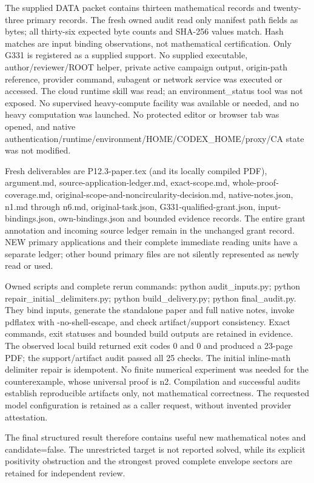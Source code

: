 \documentclass[11pt]{article}
\begin{document}
The supplied DATA packet contains thirteen mathematical records and twenty-three primary records. The fresh owned audit read only manifest path fields as bytes; all thirty-six expected byte counts and SHA-256 values match. Hash matches are input binding observations, not mathematical certification. Only G331 is registered as a supplied support. No supplied executable, author/reviewer/ROOT helper, private active campaign output, origin-path reference, provider command, subagent or network service was executed or accessed. The cloud runtime skill was read; an environment\_status tool was not exposed. No supervised heavy-compute facility was available or needed, and no heavy computation was launched. No protected editor or browser tab was opened, and native authentication/runtime/environment/HOME/CODEX\_HOME/proxy/CA state was not modified.

Fresh deliverables are P12.3-paper.tex (and its locally compiled PDF), argument.md, source-application-ledger.md, exact-scope.md, whole-proof-coverage.md, original-scope-and-noncircularity-decision.md, native-notes.json, n1.md through n6.md, original-task.json, G331-qualified-grant.json, input-bindings.json, own-bindings.json and bounded evidence records. The entire grant annotation and incoming source ledger remain in the unchanged grant record. NEW primary applications and their complete immediate reading units have a separate ledger; other bound primary files are not silently represented as newly read or used.

Owned scripts and complete rerun commands: python audit\_inputs.py; python repair\_initial\_delimiters.py; python build\_delivery.py; python final\_audit.py. They bind inputs, generate the standalone paper and full native notes, invoke pdflatex with -no-shell-escape, and check artifact/support consistency. Exact commands, exit statuses and bounded build outputs are retained in evidence. The observed local build returned exit codes 0 and 0 and produced a 23-page PDF; the support/artifact audit passed all 25 checks. The initial inline-math delimiter repair is idempotent. No finite numerical experiment was needed for the counterexample, whose universal proof is n2. Compilation and successful audits establish reproducible artifacts only, not mathematical correctness. The requested model configuration is retained as a caller request, without invented provider attestation.

The final structured result therefore contains useful new mathematical notes and candidate=false. The unrestricted target is not reported solved, while its explicit positivity obstruction and the strongest proved complete envelope sectors are retained for independent review.
\appendix
\end{document}
